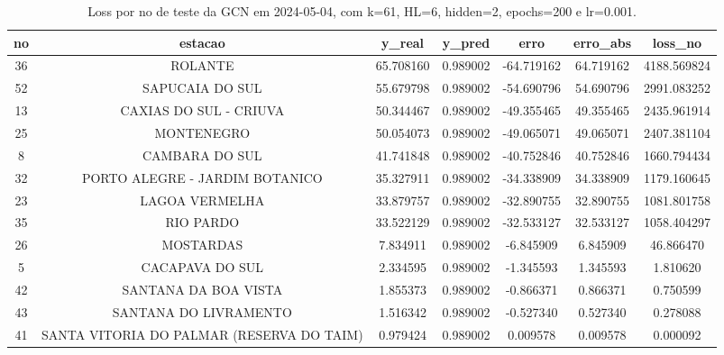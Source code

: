 \begin{table}[h]
\centering
\caption{Loss por no de teste da GCN em 2024-05-04, com k=61, HL=6, hidden=2, epochs=200 e lr=0.001.}
\label{tab:gcn_loss_k61_hl6_h2_e200_d20240504}
\begin{tabular}{ccccccc}
\toprule
no & estacao & y\_real & y\_pred & erro & erro\_abs & loss\_no \\
\midrule
36 & ROLANTE & 65.708160 & 0.989002 & -64.719162 & 64.719162 & 4188.569824 \\
52 & SAPUCAIA DO SUL & 55.679798 & 0.989002 & -54.690796 & 54.690796 & 2991.083252 \\
13 & CAXIAS DO SUL - CRIUVA & 50.344467 & 0.989002 & -49.355465 & 49.355465 & 2435.961914 \\
25 & MONTENEGRO & 50.054073 & 0.989002 & -49.065071 & 49.065071 & 2407.381104 \\
8 & CAMBARA DO SUL & 41.741848 & 0.989002 & -40.752846 & 40.752846 & 1660.794434 \\
32 & PORTO ALEGRE - JARDIM BOTANICO & 35.327911 & 0.989002 & -34.338909 & 34.338909 & 1179.160645 \\
23 & LAGOA VERMELHA & 33.879757 & 0.989002 & -32.890755 & 32.890755 & 1081.801758 \\
35 & RIO PARDO & 33.522129 & 0.989002 & -32.533127 & 32.533127 & 1058.404297 \\
26 & MOSTARDAS & 7.834911 & 0.989002 & -6.845909 & 6.845909 & 46.866470 \\
5 & CACAPAVA DO SUL & 2.334595 & 0.989002 & -1.345593 & 1.345593 & 1.810620 \\
42 & SANTANA DA BOA VISTA & 1.855373 & 0.989002 & -0.866371 & 0.866371 & 0.750599 \\
43 & SANTANA DO LIVRAMENTO & 1.516342 & 0.989002 & -0.527340 & 0.527340 & 0.278088 \\
41 & SANTA VITORIA DO PALMAR (RESERVA DO TAIM) & 0.979424 & 0.989002 & 0.009578 & 0.009578 & 0.000092 \\
\bottomrule
\end{tabular}
\end{table}

